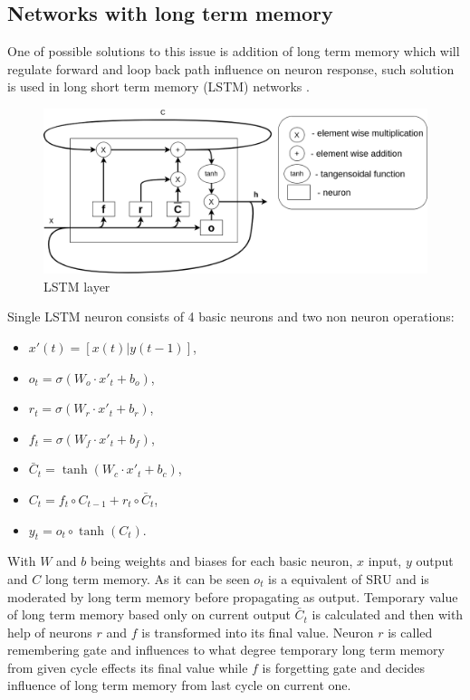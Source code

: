\subsection{Networks with long term memory}
\FloatBarrier
One of possible solutions to this issue is addition of long term memory which will regulate
forward and loop back path influence on neuron response, such solution is used in long short
term memory (LSTM) networks \cite{Hochreiter1997}.
\begin{figure}[htb] 
	\label{fig:lstm}
	\includegraphics[width=\textwidth]{figures/lstm}
	\caption{LSTM layer}
\end{figure}
Single LSTM neuron consists of 4 basic neurons and two non neuron operations:
\begin{itemize}
\item $x'(t)=[x(t)|y(t-1)]$,
\item $o_t=\sigma (W_o\cdot x'_t+b_o)$,
\item $r_t=\sigma (W_r\cdot x'_t+b_r)$,
\item $f_t=\sigma (W_f\cdot x'_t+b_f)$,
\item $\bar{C}_t=\tanh (W_c\cdot x'_t+b_c)$,
\item $C_t=f_t\circ C_{t-1}+r_t\circ \bar{C}_t$,
\item $y_t=o_t\circ \tanh (C_t)$.
\end{itemize}
With $W$ and $b$ being weights and biases for each basic neuron, $x$ input, $y$ output and
$C$ long term memory. As it can be seen $o_t$ is a equivalent of SRU and is moderated by
long term memory before propagating as output. Temporary value of long term memory based
only on current output $\bar{C}_t$ is calculated and then with help of neurons $r$ and $f$
is transformed into its final value.
Neuron $r$ is called remembering gate and influences to what degree temporary long term
memory from given cycle effects its final value while $f$ is forgetting gate and
decides influence of long term memory from last cycle on current one.

